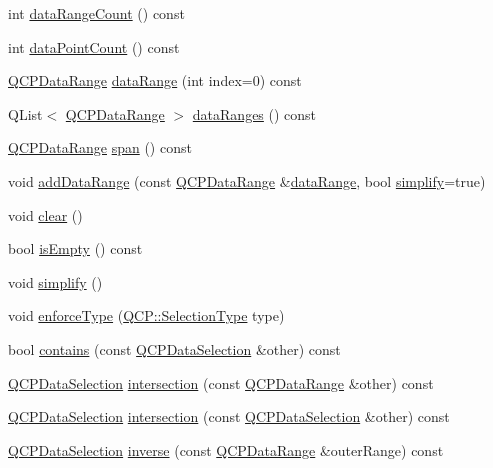 \begin{DoxyCompactItemize}
\item 
int \hyperlink{class_q_c_p_data_selection_abd8869ccb231ab991e8576de931f647d}{data\+Range\+Count} () const
\item 
int \hyperlink{class_q_c_p_data_selection_ac9e74dd294778aa799216c3435c9c4f0}{data\+Point\+Count} () const
\item 
\hyperlink{class_q_c_p_data_range}{Q\+C\+P\+Data\+Range} \hyperlink{class_q_c_p_data_selection_a6956acf6a9a49a353b4f9b58608978ad}{data\+Range} (int index=0) const
\item 
Q\+List$<$ \hyperlink{class_q_c_p_data_range}{Q\+C\+P\+Data\+Range} $>$ \hyperlink{class_q_c_p_data_selection_ac3b1c5e7713d380cd9e447f4556b94da}{data\+Ranges} () const
\item 
\hyperlink{class_q_c_p_data_range}{Q\+C\+P\+Data\+Range} \hyperlink{class_q_c_p_data_selection_a890f9291e0b7f065747040de5d68ff7d}{span} () const
\item 
void \hyperlink{class_q_c_p_data_selection_a46740c5aa7b80ae9b2abf6985d61b74f}{add\+Data\+Range} (const \hyperlink{class_q_c_p_data_range}{Q\+C\+P\+Data\+Range} \&\hyperlink{class_q_c_p_data_selection_a6956acf6a9a49a353b4f9b58608978ad}{data\+Range}, bool \hyperlink{class_q_c_p_data_selection_a4a2fbad1a6e4d1dd26fdfdf88956f2a4}{simplify}=true)
\item 
void \hyperlink{class_q_c_p_data_selection_a385dd665e6690d39afb8bbd727b1e00b}{clear} ()
\item 
bool \hyperlink{class_q_c_p_data_selection_a7f7526b475998dc0c3d6c376b24736c9}{is\+Empty} () const
\item 
void \hyperlink{class_q_c_p_data_selection_a4a2fbad1a6e4d1dd26fdfdf88956f2a4}{simplify} ()
\item 
void \hyperlink{class_q_c_p_data_selection_a17b84d852911531d229f4a76aa239a75}{enforce\+Type} (\hyperlink{namespace_q_c_p_ac6cb9db26a564b27feda362a438db038}{Q\+C\+P\+::\+Selection\+Type} type)
\item 
bool \hyperlink{class_q_c_p_data_selection_ab1ad3d5bbb55749c3f7ab1e45429c932}{contains} (const \hyperlink{class_q_c_p_data_selection}{Q\+C\+P\+Data\+Selection} \&other) const
\item 
\hyperlink{class_q_c_p_data_selection}{Q\+C\+P\+Data\+Selection} \hyperlink{class_q_c_p_data_selection_af5267ced53687561367105ee77b874ab}{intersection} (const \hyperlink{class_q_c_p_data_range}{Q\+C\+P\+Data\+Range} \&other) const
\item 
\hyperlink{class_q_c_p_data_selection}{Q\+C\+P\+Data\+Selection} \hyperlink{class_q_c_p_data_selection_af296ec5a948656c1d1ecb7b2970d2a24}{intersection} (const \hyperlink{class_q_c_p_data_selection}{Q\+C\+P\+Data\+Selection} \&other) const
\item 
\hyperlink{class_q_c_p_data_selection}{Q\+C\+P\+Data\+Selection} \hyperlink{class_q_c_p_data_selection_ae8097f4e4ffee7b1b5df27c93eb365db}{inverse} (const \hyperlink{class_q_c_p_data_range}{Q\+C\+P\+Data\+Range} \&outer\+Range) const
\end{DoxyCompactItemize}
